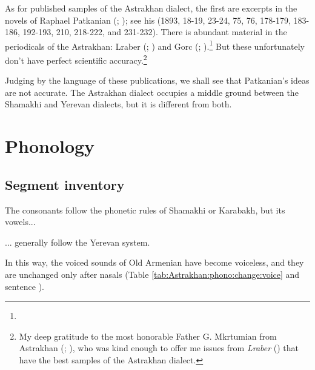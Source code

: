 As for published samples of the Astrakhan dialect, the first are excerpts in the novels of Raphael Patkanian (; ); see his  (1893,  18-19, 23-24, 75, 76, 178-179, 183-186, 192-193, 210, 218-222, and 231-232). There is abundant material in the periodicals of the Astrakhan: Lraber (; ) and Gorc (; ).\footnote{} But these unfortunately don't have perfect scientific accuracy.\footnote{My deep gratitude to the most honorable Father G. Mkrtumian from Astrakhan (; ), who was kind enough to offer me issues from \textit{Lraber} () that have the best samples of the Astrakhan dialect.}

Judging by the language of these publications, we shall see that Patkanian's ideas are not accurate. The Astrakhan dialect occupies a middle ground between the Shamakhi and Yerevan dialects, but it is different from both.

\section{Phonology}

\subsection{Segment inventory}
The consonants follow the phonetic rules of Shamakhi or Karabakh, but its vowels... 



\begin{adjarianpage}\label{page:83}\end{adjarianpage}%

... generally follow the Yerevan system. 

 
In this way, the voiced sounds of Old Armenian have become voiceless, and they are unchanged only after nasals (Table \ref{tab:Astrakhan:phono:change:voice} and sentence ).

